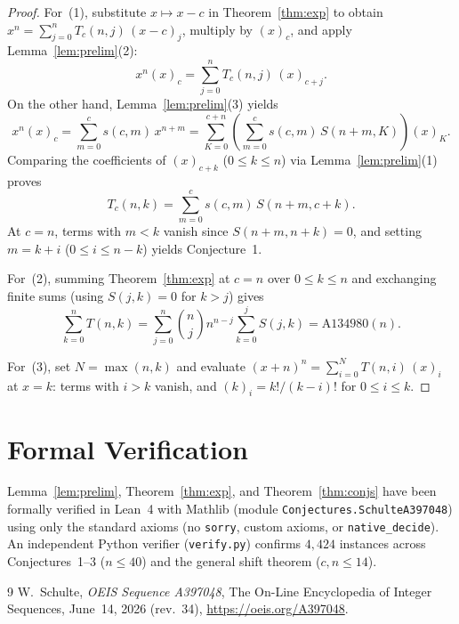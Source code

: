 \documentclass[11pt]{article}
\begin{document}
\begin{proof}
For~(1), substitute $x \mapsto x - c$ in Theorem~\ref{thm:exp} to obtain $x^n = \sum_{j=0}^{n} T_c(n, j)\, (x - c)_j$, multiply by $(x)_c$, and apply Lemma~\ref{lem:prelim}(2):
\[
  x^n (x)_c = \sum_{j=0}^{n} T_c(n, j)\, (x)_{c + j}.
\]
On the other hand, Lemma~\ref{lem:prelim}(3) yields
\[
  x^n (x)_c = \sum_{m=0}^{c} s(c, m)\, x^{n + m} = \sum_{K=0}^{c + n} \left(\sum_{m=0}^{c} s(c, m)\, S(n + m, K)\right) (x)_K.
\]
Comparing the coefficients of $(x)_{c + k}$ ($0 \le k \le n$) via Lemma~\ref{lem:prelim}(1) proves
\[
  T_c(n, k) = \sum_{m=0}^{c} s(c, m)\, S(n + m, c + k).
\]
At $c = n$, terms with $m < k$ vanish since $S(n + m, n + k) = 0$, and setting $m = k + i$ ($0 \le i \le n - k$) yields Conjecture~1.

For~(2), summing Theorem~\ref{thm:exp} at $c = n$ over $0 \le k \le n$ and exchanging finite sums (using $S(j, k) = 0$ for $k > j$) gives
\[
  \sum_{k=0}^{n} T(n, k) = \sum_{j=0}^{n} \binom{n}{j} n^{n - j} \sum_{k=0}^{j} S(j, k) = \mathrm{A134980}(n).
\]

For~(3), set $N = \max(n, k)$ and evaluate $(x + n)^n = \sum_{i=0}^{N} T(n, i)\, (x)_i$ at $x = k$: terms with $i > k$ vanish, and $(k)_i = k! / (k - i)!$ for $0 \le i \le k$.
\end{proof}

\section{Formal Verification}

Lemma~\ref{lem:prelim}, Theorem~\ref{thm:exp}, and Theorem~\ref{thm:conjs} have been formally verified in Lean~4 with Mathlib (module \texttt{Conjectures.SchulteA397048}) using only the standard axioms (no \texttt{sorry}, custom axioms, or \texttt{native\_decide}). An independent Python verifier (\texttt{verify.py}) confirms $4{,}424$ instances across Conjectures~1--3 ($n \le 40$) and the general shift theorem ($c, n \le 14$).

\begin{thebibliography}{9}
W.~Schulte,
\emph{OEIS Sequence A397048},
The On-Line Encyclopedia of Integer Sequences, June~14, 2026 (rev.~34),
\url{https://oeis.org/A397048}.
\end{thebibliography}
\end{document}
